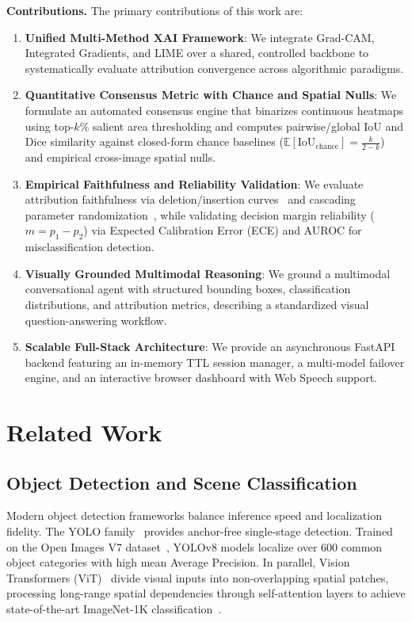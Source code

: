\documentclass[journal,10pt,twocolumn]{IEEEtran}
\begin{document}
\noindent\textbf{Contributions.} The primary contributions of this work are:
\begin{enumerate}
    \item \textbf{Unified Multi-Method XAI Framework}: We integrate Grad-CAM, Integrated Gradients, and LIME over a shared, controlled backbone to systematically evaluate attribution convergence across algorithmic paradigms.
    \item \textbf{Quantitative Consensus Metric with Chance and Spatial Nulls}: We formulate an automated consensus engine that binarizes continuous heatmaps using top-$k\%$ salient area thresholding and computes pairwise/global IoU and Dice similarity against closed-form chance baselines ($\mathbb{E}[\text{IoU}_{\text{chance}}] = \frac{k}{2-k}$) and empirical cross-image spatial nulls.
    \item \textbf{Empirical Faithfulness and Reliability Validation}: We evaluate attribution faithfulness via deletion/insertion curves~\cite{petsiuk2018rise} and cascading parameter randomization~\cite{adebayo2018sanity}, while validating decision margin reliability ($m = p_1 - p_2$) via Expected Calibration Error (ECE) and AUROC for misclassification detection.
    \item \textbf{Visually Grounded Multimodal Reasoning}: We ground a multimodal conversational agent with structured bounding boxes, classification distributions, and attribution metrics, describing a standardized visual question-answering workflow.
    \item \textbf{Scalable Full-Stack Architecture}: We provide an asynchronous FastAPI backend featuring an in-memory TTL session manager, a multi-model failover engine, and an interactive browser dashboard with Web Speech support.
\end{enumerate}

\section{Related Work}
\subsection{Object Detection and Scene Classification}
Modern object detection frameworks balance inference speed and localization fidelity. The YOLO family~\cite{jocher2023yolo} provides anchor-free single-stage detection. Trained on the Open Images V7 dataset~\cite{kuznetsova2020openimages}, YOLOv8 models localize over 600 common object categories with high mean Average Precision. In parallel, Vision Transformers (ViT)~\cite{dosovitskiy2021vit} divide visual inputs into non-overlapping spatial patches, processing long-range spatial dependencies through self-attention layers to achieve state-of-the-art ImageNet-1K classification~\cite{deng2009imagenet}.
\end{document}
